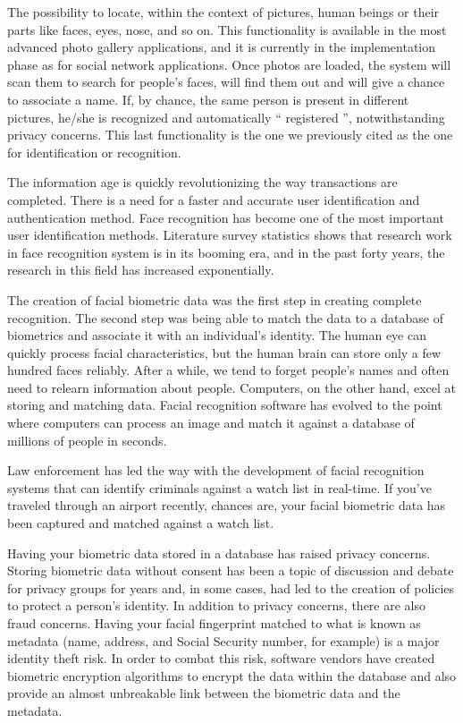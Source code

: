 \documentclass[sigconf]{acmart}
\begin{document}
The possibility to locate, within the context of pictures, human beings or their parts like faces, eyes, nose, and so on. This functionality is available in the most advanced photo gallery applications, and it is currently in the implementation phase as for social network applications. Once photos are loaded, the system will scan them to search for people’s faces, will find them out and will give a chance to associate a name. If, by chance, the same person is present in different pictures, he/she is recognized and automatically “ registered ”, notwithstanding privacy concerns. This last functionality is the one we previously cited as the one for identification or recognition.

The information age is quickly revolutionizing the way transactions are completed. There is a need for a faster and accurate user identification and authentication method. Face recognition has become one of the most important user identification methods. Literature survey statistics shows that research work in face recognition system is in its booming era, and in the past forty years, the research in this field has increased exponentially. 

The creation of facial biometric data was the first step in creating complete recognition. The second step was being able to match the data to a database of biometrics and associate it with an individual’s identity. The human eye can quickly process facial characteristics, but the human brain can store only a few hundred faces reliably. After a while, we tend to forget people’s names and often need to relearn information about people. Computers, on the other hand, excel at storing and matching data. Facial recognition software has evolved to the point where computers can process an image and match it against a database of millions of people in seconds.

Law enforcement has led the way with the development of facial recognition systems that can identify criminals against a watch list in real-time. If you’ve traveled through an airport recently, chances are, your facial biometric data has been captured and matched against a watch list.

Having your biometric data stored in a database has raised privacy concerns. Storing biometric data without consent has been a topic of discussion and debate for privacy groups for years and, in some cases, had led to the creation of policies to protect a person’s identity. In addition to privacy concerns, there are also fraud concerns. Having your facial fingerprint matched to what is known as metadata (name, address, and Social Security number, for example) is a major identity theft risk. In order to combat this risk, software vendors have created biometric encryption algorithms to encrypt the data within the database and also provide an almost unbreakable link between the biometric data and the metadata.
\end{document}
